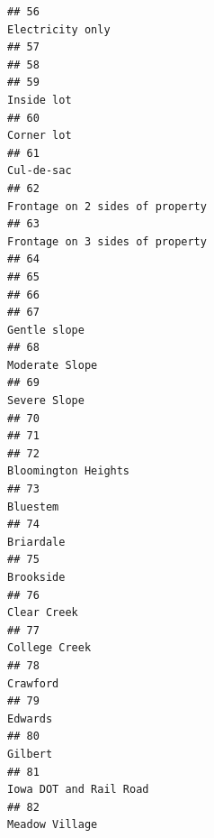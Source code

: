 \documentclass[
]{article}
\begin{document}
\begin{verbatim}
## 56                                                                            Electricity only
## 57                                                                                            
## 58                                                                                            
## 59                                                                                  Inside lot
## 60                                                                                  Corner lot
## 61                                                                                  Cul-de-sac
## 62                                                             Frontage on 2 sides of property
## 63                                                             Frontage on 3 sides of property
## 64                                                                                            
## 65                                                                                            
## 66                                                                                            
## 67                                                                                Gentle slope
## 68                                                                              Moderate Slope
## 69                                                                                Severe Slope
## 70                                                                                            
## 71                                                                                            
## 72                                                                         Bloomington Heights
## 73                                                                                    Bluestem
## 74                                                                                   Briardale
## 75                                                                                   Brookside
## 76                                                                                 Clear Creek
## 77                                                                               College Creek
## 78                                                                                    Crawford
## 79                                                                                     Edwards
## 80                                                                                     Gilbert
## 81                                                                      Iowa DOT and Rail Road
## 82                                                                              Meadow Village

\end{verbatim}
\end{document}
